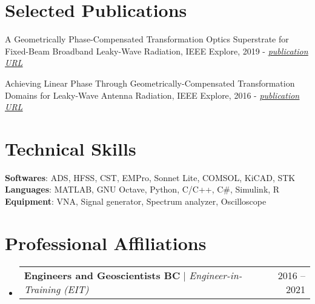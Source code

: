 \documentclass[letterpaper,11pt]{article}
\makeatletter
\newcommand{\resumeItem}[1]{
  \item\small{
    {#1 \vspace{-2pt}}
  }
}
\newcommand{\resumeSubheading}[4]{
  \vspace{-2pt}\item
    \begin{tabular*}{0.97\textwidth}[t]{l@{\extracolsep{\fill}}r}
      \textbf{#1} & #2 \\
      \textit{\small#3} & \textit{\small #4} \\
    \end{tabular*}\vspace{-7pt}
}
\newcommand{\resumeProjectHeading}[2]{
    \item
    \begin{tabular*}{0.97\textwidth}{l@{\extracolsep{\fill}}r}
      \small#1 & #2 \\
    \end{tabular*}\vspace{-7pt}
}
\newcommand{\resumeSubHeadingListStart}{\begin{itemize}[leftmargin=0.15in, label={}]}
\newcommand{\resumeSubHeadingListEnd}{\end{itemize}}
\newcommand{\resumeItemListStart}{\begin{itemize}}
\newcommand{\resumeItemListEnd}{\end{itemize}\vspace{-5pt}}
\makeatother
\begin{document}
%
\section{Selected Publications}
 \begin{itemize}[leftmargin=0.15in, label={\tiny$\bullet$}]
    \small{
    \item{A Geometrically Phase-Compensated Transformation Optics Superstrate for Fixed-Beam Broadband Leaky-Wave Radiation, IEEE Explore, 2019 - \href{https://ieeexplore.ieee.org/document/8739640}{\textit{\underline{publication URL}}}}
    \item{ Achieving Linear Phase Through Geometrically-Compensated Transformation Domains for Leaky-Wave Antenna Radiation, IEEE Explore, 2016 - \href{https://ieeexplore.ieee.org/document/7695749}{\textit{\underline{publication URL}}}}
    }
 \end{itemize}


\section{Technical Skills}
 \begin{itemize}[leftmargin=0.15in, label={}]
    \small{\item{
     \textbf{Softwares}{: ADS, HFSS, CST, EMPro, Sonnet Lite, COMSOL, KiCAD, STK} \\
     \textbf{Languages}{: MATLAB, GNU Octave, Python, C/C++, C\#, Simulink, R} \\
     \textbf{Equipment}{: VNA, Signal generator, Spectrum analyzer, Oscilloscope}
    }}
 \end{itemize}

%
\section{Professional Affiliations}
    \resumeSubHeadingListStart
      \resumeProjectHeading
          {\textbf{Engineers and Geoscientists BC} $|$ \emph{Engineer-in-Training (EIT) }}{2016 -- 2021}


    \resumeSubHeadingListEnd
    
%

    
\end{document}
